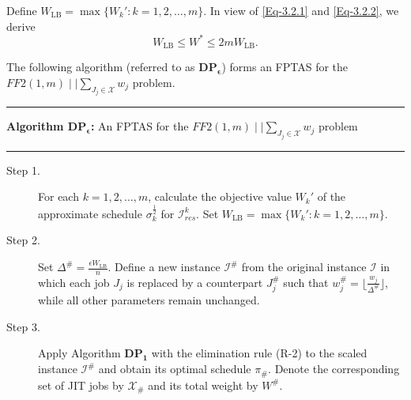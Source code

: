 \documentclass[12pt, eqno, limlimits]{article}
\begin{document}
\begin{sloppypar}
        Define $W_{\mathrm{LB}}=\max\{W_k': k=1, 2, \ldots, m\}$. In view of \eqref{Eq-3.2.1} and \eqref{Eq-3.2.2}, we derive  
        \begin{equation} \label{Eq-3.2.3}
            W_{\mathrm{LB}} \leq W^{*} \leq 2m W_{\mathrm{LB}}.
        \end{equation} 
        
        The following algorithm (referred to as $\mathbf{DP_{\epsilon}}$) forms an FPTAS for the $FF2(1, m)\mid \mid \sum_{J_j \in \mathcal{X}} w_j$ problem. 
        
        \begin{algorithm}[tbp] 
            \small
            \linespread{1.2}\selectfont
            \SetAlgoLined
            \DontPrintSemicolon
            \hrule 
            \vspace{0.1cm}
            \textbf{Algorithm $\mathbf{DP_{\epsilon}}$:} An FPTAS for the $FF2(1, m)\mid \mid \sum_{J_j \in \mathcal{X}} w_j$ problem
            \vspace{0.1cm}
            \hrule 
            \vspace{0.1cm}
            
            \vspace{0.1cm}
            
            \begin{description}
                \item[Step 1.] For each $k=1, 2, \ldots, m$, calculate the objective value $W_k'$ of the approximate schedule $\sigma_k^{\frac{1}{2}}$ for $\mathcal{I}_{res}^k$.  Set $W_{\mathrm{LB}}=\max\{W_k': k=1, 2, \ldots, m\}$.
                
                \item[Step 2.] Set $\Delta^{\#}=\frac{\epsilon W_{\mathrm{LB}}}{n}$. Define a new instance $\mathcal{I}^{\#}$ from the original instance $\mathcal{I}$ in which each job $J_j$ is replaced by a counterpart $J_j^{\#}$ such that $w_j^{\#}=\lfloor \frac{w_j}{\Delta^{\#}} \rfloor$, while all other parameters remain unchanged.
                
                \item[Step 3.] Apply Algorithm $\mathbf{DP_1}$ with the elimination rule (R-2) to the scaled instance $\mathcal{I}^{\#}$ and obtain its optimal schedule $\pi_{\#}$. Denote the corresponding set of JIT jobs by $\mathcal{X}_{\#}$ and its total weight by $W^{\#}$.
                

\end{description}
\end{algorithm}
\end{sloppypar}
\end{document}
